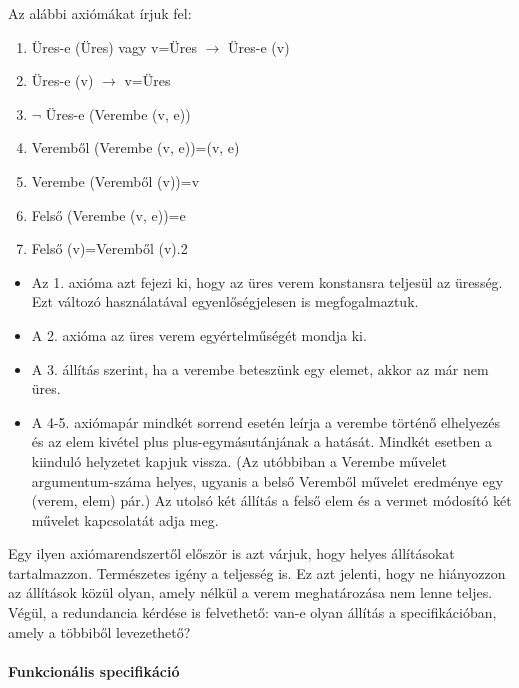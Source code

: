 \documentclass[12pt,margin=0px]{article}
\newcommand\lword[1]{\leavevmode\nobreak\hskip0pt plus\linewidth\penalty50\hskip0pt plus-\linewidth\nobreak #1}
\begin{document}
    {\footnotesize
    \noindent Az alábbi axiómákat írjuk fel:

    \begin{enumerate}
        \item Üres-e (Üres) vagy v=Üres $\rightarrow$ Üres-e (v)
        \item  Üres-e (v) $\rightarrow$ v=Üres
        \item  $\neg$ Üres-e (Verembe (v, e))
        \item  Veremből (Verembe (v, e))=(v, e)
        \item  Verembe (Veremből (v))=v
        \item  Felső (Verembe (v, e))=e
        \item  Felső (v)=Veremből (v).2
    \end{enumerate}

    \begin{itemize}
        \item Az 1. axióma azt fejezi ki, hogy az üres verem konstansra teljesül az üresség.\\
        Ezt változó használatával egyenlőségjelesen is megfogalmaztuk.
        \item A 2. axióma az üres verem egyértelműségét mondja ki.
        \item A 3. állítás szerint, ha a verembe beteszünk egy elemet, akkor az már nem üres.
        \item A 4-5. axiómapár mindkét sorrend esetén leírja a verembe történő elhelyezés és az elem kivétel \lword{egymásutánjának} a hatását. Mindkét esetben a kiinduló helyzetet kapjuk vissza. (Az utóbbiban a Verembe művelet argumentum-száma helyes, ugyanis a belső Veremből művelet eredménye egy (verem, elem) pár.) Az utolsó két állítás a felső elem és a vermet módosító két művelet kapcsolatát adja meg.
    \end{itemize}

    Egy ilyen axiómarendszertől először is azt várjuk, hogy helyes állításokat tartalmazzon. Természetes igény a teljesség is. Ez azt jelenti, hogy ne hiányozzon az állítások közül olyan, amely nélkül a verem meghatározása nem lenne teljes. Végül, a redundancia kérdése is felvethető: van-e olyan állítás a specifikációban, amely a többiből levezethető?\\
    }
    \noindent {\footnotesize $\triangleleft$ \faLightbulbO }

    \paragraph{Funkcionális specifikáció\\\\}
\end{document}
